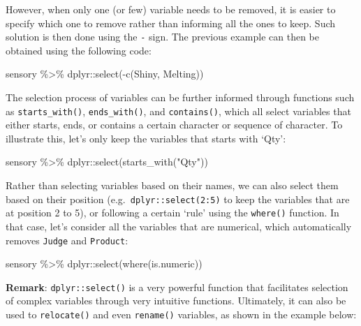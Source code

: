 \documentclass[
]{book}
\newenvironment{Shaded}{\begin{snugshade}}{\end{snugshade}}
\newcommand{\FunctionTok}[1]{\textcolor[rgb]{0.00,0.00,0.00}{#1}}
\newcommand{\NormalTok}[1]{#1}
\newcommand{\SpecialCharTok}[1]{\textcolor[rgb]{0.00,0.00,0.00}{#1}}
\newcommand{\StringTok}[1]{\textcolor[rgb]{0.31,0.60,0.02}{#1}}
\begin{document}
However, when only one (or few) variable needs to be removed, it is easier to specify which one to remove rather than informing all the ones to keep. Such solution is then done using the \texttt{-} sign. The previous example can then be obtained using the following code:

\begin{Shaded}
\begin{Highlighting}[]
\NormalTok{sensory }\SpecialCharTok{\%\textgreater{}\%} 
\NormalTok{  dplyr}\SpecialCharTok{::}\FunctionTok{select}\NormalTok{(}\SpecialCharTok{{-}}\FunctionTok{c}\NormalTok{(Shiny, Melting))}
\end{Highlighting}
\end{Shaded}

The selection process of variables can be further informed through functions such as \texttt{starts\_with()}, \texttt{ends\_with()}, and \texttt{contains()}, which all select variables that either starts, ends, or contains a certain character or sequence of character. To illustrate this, let's only keep the variables that starts with `Qty':

\begin{Shaded}
\begin{Highlighting}[]
\NormalTok{sensory }\SpecialCharTok{\%\textgreater{}\%} 
\NormalTok{  dplyr}\SpecialCharTok{::}\FunctionTok{select}\NormalTok{(}\FunctionTok{starts\_with}\NormalTok{(}\StringTok{"Qty"}\NormalTok{))}
\end{Highlighting}
\end{Shaded}

Rather than selecting variables based on their names, we can also select them based on their position (e.g.~\texttt{dplyr::select(2:5)} to keep the variables that are at position 2 to 5), or following a certain `rule' using the \texttt{where()} function. In that case, let's consider all the variables that are numerical, which automatically removes \texttt{Judge} and \texttt{Product}:

\begin{Shaded}
\begin{Highlighting}[]
\NormalTok{sensory }\SpecialCharTok{\%\textgreater{}\%} 
\NormalTok{  dplyr}\SpecialCharTok{::}\FunctionTok{select}\NormalTok{(}\FunctionTok{where}\NormalTok{(is.numeric))}
\end{Highlighting}
\end{Shaded}

\textbf{Remark}: \texttt{dplyr::select()} is a very powerful function that facilitates selection of complex variables through very intuitive functions. Ultimately, it can also be used to \texttt{relocate()} and even \texttt{rename()} variables, as shown in the example below:
\end{document}
